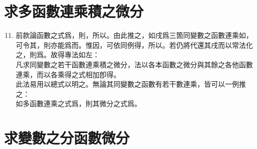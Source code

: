 \section{求多函數連乘積之微分}

\begin{enumerate} [label={第\chinese*款}]
	\setcounter{enumi}{10}
	\item 前款論函數之式爲\CJKmove，則\CJKmove，所以\CJKmove。由此推之，如戌爲三箇同變數之函數連乘如\CJKmove，可令其\CJKmove，則亦能爲\CJKmove 而\CJKmove。惟因\CJKmove，可依同例得\CJKmove，所以\CJKmove。若仍將\CJKmove 代還其戌而以常法化之，則爲\CJKmove。故得專法如左：\\
	凡求同變數之若干函數連乘積之微分，法以各本函數之微分與其餘之各他函數連乘，而以各乘得之式相加卽得。\\
	此法易用以總式以明之。無論其同變數之函數有若干數連乘，皆可以一例推之：\\
	如多函數連乘之式爲\CJKmove，則其微分之式爲\CJKmove。
\end{enumerate}

\section{求變數之分函數微分}

